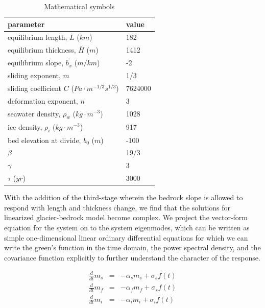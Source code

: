 \documentclass[tc, manuscript]{copernicus}
\begin{document}
\begin{table}[h]
    \begin{tabular}{l|l}
        \hline
        \bf{parameter} & \bf{value} \\
        \hline
        equilibrium length, $\bar{L}$ ($km$) &  182 \\
        equilibrium thickness, $\bar{H}$ ($m$) & 1412 \\
        equilibrium slope, $\bar{b_x}$ ($m/km$) &  -2  \\
        sliding exponent, $m$ & 1/3 \\
        sliding coefficient $C$ ($Pa\cdot m^{-1/3}s^{1/3}$) & 7624000 \\
        deformation exponent, $n$ & 3 \\
        seawater density, $\rho_w$ ($kg \cdot m^{-3}$)  & 1028 \\
        ice density, $\rho_i$ ($kg \cdot m^{-3}$) & 917 \\
        bed elevation at divide, $b_0$ ($m$) & -100 \\
        $\beta$ & 19/3 \\
        $\gamma$ & 3 \\
        $\tau$ ($yr$) & 3000\\
    \end{tabular}
    \caption{Mathematical symbols}
\end{table}



With the addition of the third-stage wherein the bedrock slope is allowed to respond with length and thickness change, we find that the solutions for linearized glacier-bedrock model become complex. We project the vector-form equation for the system on to the system eigenmodes, which can be written as simple one-dimensional linear ordinary differential equations for which we can write the green's function in the time domain, the power spectral density, and the covariance function explicitly to further understand the character of the response. 

\begin{align}
\frac{d}{dt} m_s  &=& -\alpha_s m_s + \sigma_s f(t)\\
\frac{d}{dt} m_f &=& -\alpha_f m_f + \sigma_s f(t)\\
\frac{d}{dt} m_{i} &=& -\alpha_i m_{i} + \sigma_{i} f(t)
\end{align}
\end{document}
